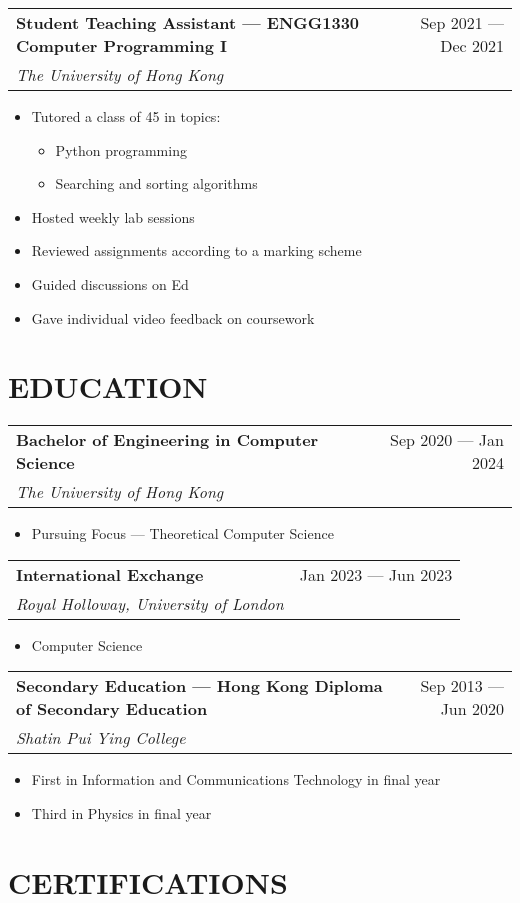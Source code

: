 \documentclass{article}
\newcommand{\jobTitle}[3]{
\begin{tabularx}{\linewidth}{ X r }
    \textbf{#1} & #2\\
    \textit{#3} &
\end{tabularx}
}
\begin{document}
\jobTitle
{Student Teaching Assistant --- ENGG1330 Computer Programming I}
{Sep 2021 --- Dec 2021}
{The University of Hong Kong}
\begin{itemize}[leftmargin=1.2cm]
    \item Tutored a class of 45 in topics:
    \begin{itemize}
        \item Python programming
        \item Searching and sorting algorithms
    \end{itemize}
    \item Hosted weekly lab sessions
    \item Reviewed assignments according to a marking scheme
    \item Guided discussions on Ed
    \item Gave individual video feedback on coursework
\end{itemize}

\section{EDUCATION}

\jobTitle
{Bachelor of Engineering in Computer Science}
{Sep 2020 --- Jan 2024}
{The University of Hong Kong}
\begin{itemize}[leftmargin=1.2cm]
    \item Pursuing Focus --- Theoretical Computer Science
\end{itemize}

\jobTitle
{International Exchange}
{Jan 2023 --- Jun 2023}
{Royal Holloway, University of London}
\begin{itemize}[leftmargin=1.2cm]
    \item Computer Science
\end{itemize}

\jobTitle
{Secondary Education --- Hong Kong Diploma of Secondary Education}
{Sep 2013 --- Jun 2020}
{Shatin Pui Ying College}
\begin{itemize}[leftmargin=1.2cm]
    \item First in Information and Communications Technology in final year
    \item Third in Physics in final year
\end{itemize}

\section{CERTIFICATIONS}
\end{document}
